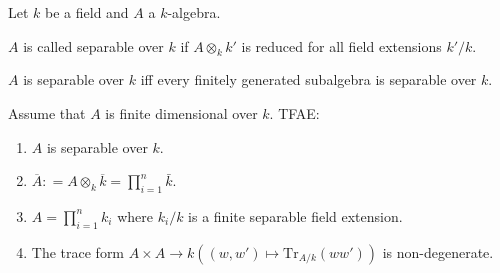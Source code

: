 \documentclass[oneside, 12pt, ]{scrbook}
\theoremstyle{theorem}
\begin{document}
Let $k$ be a field and $A$ a $k$-algebra.

\begin{definition}
$A$ is called separable over $k$ if $A \otimes_{k} k'$ is reduced for all field extensions $k' /k$.
\end{definition}

\begin{lemma}
$A$ is separable over $k$ iff every finitely generated subalgebra is separable over $k$.
\end{lemma}

\begin{proposition}
Assume that $A$ is finite dimensional over $k$. TFAE:
\begin{enumerate}
\item $A$ is separable over $k$.
\item $\overline{A}: = A \otimes_{k} \overline{k} = \prod_{i=1}^n \bar{k}$.
\item $A = \prod_{i=1}^n k_{i}$ where $k_{i}/k$ is a finite separable field extension.
\item The trace form $A \times A \rightarrow k ((w,w') \mapsto \mathrm{Tr}_{A/k}(ww'))$ is non-degenerate.
\end{enumerate}
\end{proposition}
\end{document}
